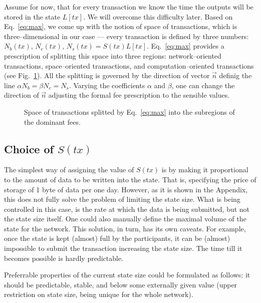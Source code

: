 \documentclass[]{llncs}   %
\newcommand{\authnote}[2]{\marginpar{\parbox{\marginparwidth}{\tiny %
  \textsf{#1 {\textcolor{blue}{notes: #2}}}}}%
  \textcolor{blue}{\textbf{\dag}}}
\newcommand{\authnote}[2]{
  \textsf{#1\textcolor{blue}{ #2}}}
\newcommand{\authnote}[2]{}
\newcommand{\vk}[1]{{\authnote{\textcolor{red}{V:}}{#1}}}
\begin{document}
Assume for now, that for every transaction we know the time the outputs will be
stored in the state $L[tx]$. We will overcome this difficulty later. Based on
Eq.~\eqref{eq:max}, we come up with the notion of space of transactions, which
is three--dimensional in our case --- every transaction is defined by three
numbers: $N_b(tx)$, $N_c(tx)$, $N_s(tx) = S(tx)L[tx]$. Eq.~\eqref{eq:max} provides a
prescription of splitting this space into three regions: network--oriented
transactions, space--oriented transactions, and computation--oriented
transactions (see Fig.~\ref{fig:max}). All the splitting is governed by the
direction of vector $\vec{n}$ definig the line $\alpha N_b=\beta N_c=N_s$.
Varying the coefficients $\alpha$ and $\beta$, one can change the direction of
$\vec{n}$ adjusting the formal fee prescription to the sensible values.\vk{It
    would be good and convincing to get some actual data from the existing
network.}
\begin{figure}
    \center
    
    \caption{Space of transactions splitted by
        Eq.~\eqref{eq:max} into the subregions of the dominant fees.\label{fig:max}}
\end{figure}

\subsection{Choice of $S(tx)$}

The simplest way of assigning the value of $S(tx)$ is by making it proportional to
the amount of data to be written into the state. That is, specifying the price
of storage of 1 byte of data per one day. However, as it is shown in the
Appendix, this does not fully solve the problem of limiting the state size. What
is being controlled in this case, is the rate at which the data is being
submitted, but not the state size itself. One could also manually define the
maximal volume of the state for the network. This solution, in turn, has its own
caveats. For example, once the state is kept (almost) full by the participants,
it can be (almost) impossible to submit the transaction increasing the state size.
The time till it becomes possible is hardly predictable. 

Preferrable properties of the current state size could be formulated as follows:
it should be predictable, stable, and below some externally given value (upper
restriction on state size, being unique for the whole network). 
\end{document}
